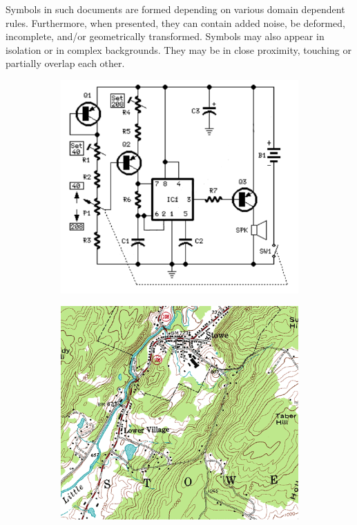 Symbols in such documents are formed depending on various domain dependent rules\cite{Cordella_2000}. Furthermore, when presented, they can contain added noise, be deformed, incomplete, and/or geometrically transformed. Symbols may also appear in isolation or in complex backgrounds. They may be in close proximity, touching or partially overlap each other. \\

\begin{figure}[h]
\centering
    \begin{subfigure}[b]{0.4\textwidth}
        \centering
        \includegraphics[width=1\textwidth]{figures/LitreatureReview/schematic.png}
        \caption{}
        \label{fig:electrical}
    \end{subfigure}
    \begin{subfigure}[b]{0.4\textwidth}
        \centering
        \includegraphics[width=1\textwidth]{figures/LitreatureReview/map2.png}

\end{subfigure}
\end{figure}
